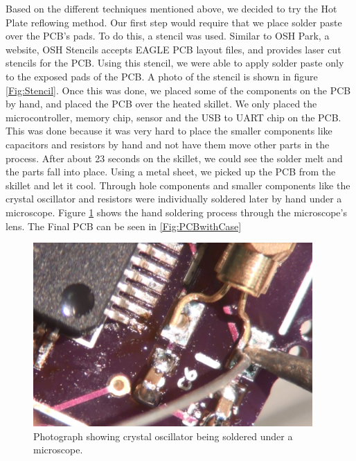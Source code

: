 Based on the different techniques mentioned above,
we decided to try the Hot Plate reflowing method.
Our first step would require that we place solder paste over the PCB's pads.
To do this,
a stencil was used.
Similar to OSH Park, a website, OSH Stencils accepts EAGLE PCB layout files,
and provides laser cut stencils for the PCB.
Using this stencil,
we were able to apply solder paste only to the exposed pads of the PCB.
A photo of the stencil is shown in figure \ref{Fig:Stencil}.
Once this was done,
we placed some of the components on the PCB by hand,
and placed the PCB over the heated skillet.
We only placed the microcontroller, memory chip, sensor and the USB to UART chip on the PCB.
This was done because it was very hard to place the smaller components like capacitors and resistors by hand and not have them move other parts in the process.
After about 23 seconds on the skillet,
we could see the solder melt and the parts fall into place.
Using a metal sheet,
we picked up the PCB from the skillet and let it cool.
Through hole components and smaller components like the crystal oscillator and resistors were individually soldered later by hand under a microscope.
Figure \ref{Fig:PCBMicro} shows the hand soldering process through the microscope's lens. The Final PCB can be seen in \ref{Fig:PCBwithCase}
\begin{figure}
\begin{center}
\includegraphics[width=0.95\textwidth]{images/PCBMicro.jpg}
\caption{Photograph showing crystal oscillator being soldered under a microscope.}
\label{Fig:PCBMicro}
\end{center}
\end{figure}
